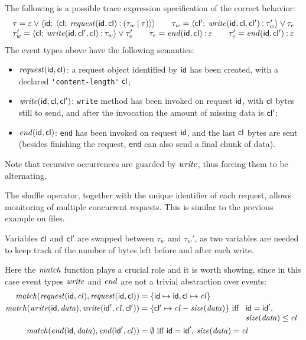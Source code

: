 The following is a possible trace expression specification of the correct behavior:
$$
\begin{array}{l}
\tau = \varepsilon \mathbin{\vee} {\langle}\mathsf{id};\:{{\langle}\mathsf{cl};\:{ \mathit{request}(\mathsf{id}, \mathsf{cl}) \mathbin{:} (\tau_w\mathbin{|}\tau)}{\rangle}}{\rangle}\qquad
\tau_w = {\langle}\mathsf{cl'};\:{\mathit{write}(\mathsf{id}, \mathsf{cl}, \mathsf{cl'})\mathbin{:}\tau_w'}{\rangle} \mathbin{\vee} \tau_e\\
\tau_w' = {\langle}\mathsf{cl};\:{\mathit{write}(\mathsf{id}, \mathsf{cl'}, \mathsf{cl})\mathbin{:} \tau_w}{\rangle} \mathbin{\vee} \tau_e'\qquad
\tau_e = \mathit{end}(\mathsf{id}, \mathsf{cl})\mathbin{:} \varepsilon\qquad
\tau_e' = \mathit{end}(\mathsf{id}, \mathsf{cl'})\mathbin{:}\varepsilon
\end{array}
$$
The event types above have the following semantics:
\begin{itemize}
\item  \(\mathit{request}(\mathsf{id}, \mathsf{cl})\): a request object identified by \(\mathsf{id}\) has been created, with a declared \lstinline{'content-length'} \(\mathsf{cl}\);
\item \(\mathit{write}(\mathsf{id}, \mathsf{cl}, \mathsf{cl'})\): \lstinline{write} method has been invoked on request \(\mathsf{id}\), with \(\mathsf{cl}\) bytes still to send, and after the invocation the amount of missing data is \(\mathsf{cl'}\);
\item \(\mathit{end}(\mathsf{id}, \mathsf{cl})\): \lstinline{end} has been invoked on request \(\mathsf{id}\), and the last \(\mathsf{cl}\) bytes are sent (besides finishing the request, \lstinline{end} can also send a final chunk of data).
\end{itemize}

Note that recursive occurrences are guarded by \(\mathit{write}\), thus forcing them to be alternating.

The shuffle operator, together with the unique identifier of each request, allows monitoring of multiple concurrent requests.
This is similar to the previous example on files.

Variables \(\mathsf{cl}\) and \(\mathsf{cl'}\) are swapped between \(\tau_w\) and \(\tau_w'\), as two variables are needed to keep track of the number of bytes left before and after each write.

Here the \(\mathit{match}\) function plays a crucial role and it is worth showing, since in this case event types $\mathit{write}$ and $\mathit{end}$ are not a trivial abstraction over events:
\begin{align*}
\mathit{match}(\mathit{request}(\mathsf{id}, \mathit{cl}), \mathit{request}(\mathsf{id}, \mathsf{cl})) &= \{ \mathsf{id} \mapsto \mathsf{id}, \mathsf{cl} \mapsto \mathit{cl} \}\\
\mathit{match}(\mathit{write}(\mathsf{id}, \mathit{data}), \mathit{write}(\mathsf{id}', \mathit{cl}, \mathsf{cl'})) &= \{ \mathsf{cl'} \mapsto \mathit{cl}-\mathit{size}(\mathit{data}) \} \mbox{ iff $\begin{array}[t]{l}\mathsf{id}=\mathsf{id}',\\ \mathit{size}(\mathit{data})\leq\mathit{cl}\end{array}$} \\
\mathit{match}(\mathit{end}(\mathsf{id}, \mathit{data}), \mathit{end}(\mathsf{id}', \mathit{cl})) &= \emptyset \mbox{ iff $\mathsf{id}=\mathsf{id}',\, \mathit{size}(\mathit{data})=\mathit{cl}$}
\end{align*}

